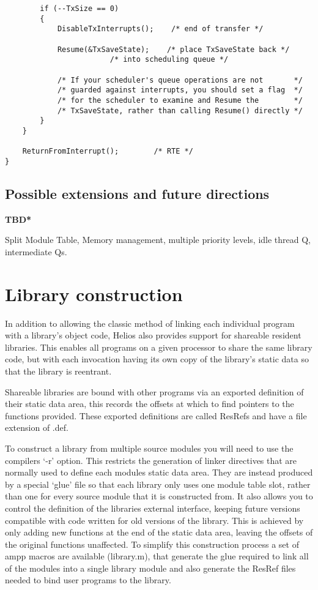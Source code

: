 \begin{verbatim}
        if (--TxSize == 0)
        {
            DisableTxInterrupts();    /* end of transfer */

            Resume(&TxSaveState);    /* place TxSaveState back */
                        /* into scheduling queue */

            /* If your scheduler's queue operations are not       */
            /* guarded against interrupts, you should set a flag  */
            /* for the scheduler to examine and Resume the        */
            /* TxSaveState, rather than calling Resume() directly */
        }
    }

    ReturnFromInterrupt();        /* RTE */
}
\end{verbatim}
\normalsize

\subsection{Possible extensions and future directions}
{\bf *TBD*}

Split Module Table, Memory management, multiple priority levels, idle thread Q,
intermediate Qs.

\section{Library construction}

In addition to allowing the classic method of linking each individual program
with a library's object code, Helios also provides support for shareable
resident libraries. This enables all programs on a given processor to
share the same library code, but with each invocation having its own copy of
the library's static data so that the library is reentrant.

Shareable libraries are bound with other programs via an exported definition
of their static data area, this records the offsets at which to find pointers
to the functions provided.
These exported definitions are called ResRefs and have a file
extension of .def.

To construct a library from multiple source modules you will need to use the
compilers `-r' option. This restricts the generation of linker directives that
are normally used to define each modules static data area. They are instead
produced by a special `glue' file so that each library only uses one
module table slot, rather than one for every
source module that it is constructed from.
It also allows you to control the definition of
the libraries external interface, keeping future versions compatible with
code written for old versions of the library. This is achieved by only
adding new functions at the end of the static data area, leaving the
offsets of the original functions unaffected.
To simplify this construction process a set of ampp macros are available
(library.m), that generate the glue required to link all of the modules into
a single library module and also generate the ResRef files needed to bind
user programs to the library.


